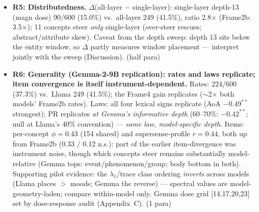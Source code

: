 \documentclass[11pt]{article}
\newenvironment{outline}{\color{gray!70!black}\begin{itemize}[leftmargin=1.2em,itemsep=1pt]}{\end{itemize}\color{black}}
\begin{document}
\begin{outline}
\item \textbf{R5: Distributedness.} $\Delta$(all-layer $-$ single-layer): single-layer depth-13 (magn dose) 90/600 (15.0\%) vs.\ all-layer 249 (41.5\%), ratio 2.8$\times$ (Frame2b: 3.5$\times$); 11 concepts steer \emph{only} single-layer (over-steer rescues; abstract/attribute skew). Caveat from the depth sweep: depth 13 sits below the entity window, so $\Delta$ partly measures window placement --- interpret jointly with the sweep (Discussion). (half para)
\item \textbf{R6: Generality (Gemma-2-9B replication): rates and laws replicate; item convergence is itself instrument-dependent.} Rates: 224/600 (37.3\%) vs.\ Llama 249 (41.5\%); the Frame4 gain replicates ($\sim$2$\times$ both models' Frame2b rates). Laws: all four lexical signs replicate (AoA $-0.49^{**}$ strongest); PR replicates \emph{at Gemma's informative depth} (60--70\%: $-0.42^{**}$; null at Llama's 40\% convention) --- \emph{same law, model-specific depth}. Items: per-concept $\phi = 0.43$ (154 shared) and supersense-profile $r = 0.44$, both up from Frame2b (0.33 / 0.12 n.s.): part of the earlier item-divergence was instrument noise, though which concepts steer remains substantially model-relative (Gemma tops: event/phenomenon/group; body bottom in both). Supporting pilot evidence: the $\lambda_1$/trace class ordering \emph{inverts} across models (Llama places $>$ moods; Gemma the reverse) --- spectral values are model-geometry-laden; compare within-model only. Gemma dose grid [14,17,20,23] set by dose-response audit (Appendix~C). (1 para)
\end{outline}

\end{document}
